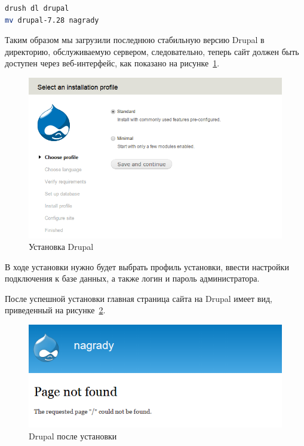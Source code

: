 \begin{lstlisting}[language=bash,
  caption=Установки Drupal с помощью Drush,
  label=lst:install_drupal]
drush dl drupal
mv drupal-7.28 nagrady
\end{lstlisting}

Таким образом мы загрузили последнюю стабильную версию Drupal в директорию,
обслуживаемую сервером, следовательно, теперь сайт должен быть доступен через
веб-интерфейс, как показано на рисунке~\ref{fig:drupal_install}.

\begin{figure}[h]
  \centering
  \includegraphics[width=150mm]{pic/drupal_install.png}
  \caption{Установка Drupal}
  \label{fig:drupal_install}
\end{figure}

В ходе установки нужно будет выбрать профиль установки, 
ввести настройки подключения к базе данных, а также логин и пароль администратора.

После успешной установки главная страница сайта на Drupal имеет вид, 
приведенный на рисунке~\ref{fig:drupal_after_install}.

\begin{figure}[h]
  \centering
  \includegraphics[width=150mm]{pic/drupal_after_install.png}
  \caption{Drupal после установки}
  \label{fig:drupal_after_install}
\end{figure}

